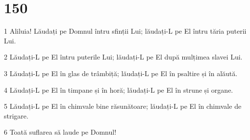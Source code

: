 \chapter{150}

\par 1 Aliluia! Lăudați pe Domnul întru sfinții Lui; lăudați-L pe El întru tăria puterii Lui.
\par 2 Lăudați-L pe El întru puterile Lui; lăudați-L pe El după mulțimea slavei Lui.
\par 3 Lăudați-L pe El în glas de trâmbiță; lăudați-L pe El în psaltire și în alăută.
\par 4 Lăudați-L pe El în timpane și în horă; lăudați-L pe El în strune și organe.
\par 5 Lăudați-L pe El în chimvale bine răsunătoare; lăudați-L pe El în chimvale de strigare.
\par 6 Toată suflarea să laude pe Domnul!










